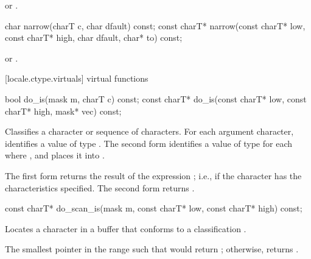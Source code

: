 \begin{itemdescr}
\pnum
\returns
{} or .
\end{itemdescr}

%
\begin{itemdecl}
char         narrow(charT c, char dfault) const;
const charT* narrow(const charT* low, const charT* high, char dfault, char* to) const;
\end{itemdecl}

\begin{itemdescr}
\pnum
\returns
{} or .
\end{itemdescr}

[locale.ctype.virtuals]{ virtual functions}

%
\begin{itemdecl}
bool         do_is(mask m, charT c) const;
const charT* do_is(const charT* low, const charT* high, mask* vec) const;
\end{itemdecl}

\begin{itemdescr}
\pnum
\effects
Classifies a character or sequence of characters.
For each argument character,
identifies a value  of type .
The second form identifies a value  of type 
for each  where ,
and places it into .

\pnum
\returns
The first form returns the result of the expression ;
i.e.,  if the character has the characteristics specified.
The second form returns .
\end{itemdescr}

%
\begin{itemdecl}
const charT* do_scan_is(mask m, const charT* low, const charT* high) const;
\end{itemdecl}

\begin{itemdescr}
\pnum
\effects
Locates a character in a buffer that conforms to a classification .

\pnum
\returns
The smallest pointer  in the range 
such that  would return ;
otherwise, returns .
\end{itemdescr}

